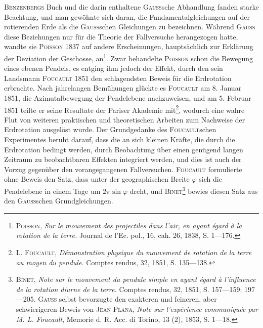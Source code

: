 \clearpage\begingroup{}
\renewcommand{\thefootnote}{\arabic{footnote})}\setcounter{footnote}{15}
\begin{center}\end{center}
\noindent\hspace*{\parindent}\textsc{Benzenbergs} Buch und die darin enthaltene \textsc{Gauss}sche Abhandlung fanden
starke Beachtung, und man gewöhnte sich daran, die Fundamentalgleichungen
auf der rotierenden Erde als die \textsc{Gauss}schen Gleichungen zu bezeichnen.
Während \textsc{Gauss} diese Beziehungen nur für die Theorie der Fallversuche herangezogen
hatte, wandte sie \textsc{Poisson} 1837 auf andere Erscheinungen, hauptsächlich
zur Erklärung der Deviation der Geschosse, an\footnote{\textsc{Poisson}, \textit{Sur le mouvement des projectiles dans l’air, en ayant égard à la rotation de la terre.}
Journal de l’Ec. pol., 16, cah. 26, 1838, S. 1—176.}. Zwar behandelte
\textsc{Poisson} schon die Bewegung eines ebenen Pendels, es entging ihm jedoch der
Effekt, durch den sein Landsmann \textsc{Foucault} 1851 den schlagendsten Beweis
für die Erdrotation erbrachte. Nach jahrelangen Bemühungen glückte es
\textsc{Foucault} am 8. Januar 1851, die Azimutalbewegung der Pendelebene nachzuweisen,
und am 5. Februar 1851 teilte er seine Resultate der Pariser Akademie
mit\footnote{L. \textsc{Foucault}, \textit{Démonstration physique du mouvement de rotation de la terre au moyen du pendule.}
Comptes rendus, 32, 1851, S. 135—138.}, wodurch eine wahre Flut von weiteren praktischen und theoretischen
Arbeiten zum Nachweise der Erdrotation ausgelöst wurde. Der
Grundgedanke des \textsc{Foucault}schen Experimentes beruht darauf, dass die an
sich kleinen Kräfte, die durch die Erdrotation bedingt werden, durch Beobachtung
über einen genügend langen Zeitraum zu beobachtbaren Effekten
integriert werden, und dies ist auch der Vorzug gegenüber den vorangegangenen
Fallversuchen. \textsc{Foucault} formulierte ohne Beweis den Satz, dass unter der
geographischen Breite $\varphi$ sich die Pendelebene in einem Tage um $2\pi\sin\varphi$
dreht, und \textsc{Binet}\footnote{\textsc{Binet}, \textit{Note sur le mouvement du pendule simple en ayant égard à l’influence de la rotation
diurne de la terre.} Comptes rendus, 32, 1851, S. 157—159; 197—205. \textsc{Gauss} selbst bevorzugte den
exakteren und feineren, aber schwierigeren Beweis von \textsc{Jean Plana}, \textit{Note sur l’expérience communiquée
par M. L. Foucault}, Memorie d. R. Acc. di Torino, 13 (2), 1853, S. 1—18.} bewies diesen Satz aus den \textsc{Gauss}schen Grundgleichungen.
